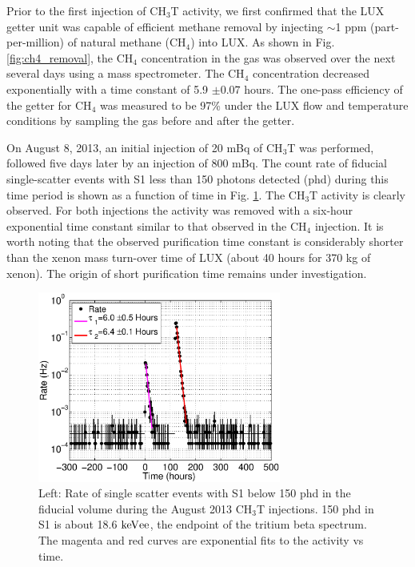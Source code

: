 Prior to the first injection of CH$_3$T activity, we first confirmed that the LUX getter unit was capable of efficient methane removal by injecting  $\sim$1 ppm (part-per-million) of natural methane (CH$_4$) into LUX. As shown in Fig. \ref{fig:ch4_removal}, the CH$_4$ concentration in the gas was observed over the next several days using a mass spectrometer. The CH$_4$ concentration decreased exponentially with a time constant of 5.9 $\pm 0.07$ hours. The one-pass efficiency of the getter for CH$_4$ was measured to be 97\% under the LUX flow and temperature conditions by sampling the gas before and after the getter. 

On August 8, 2013, an initial injection of 20 mBq of CH$_3$T was performed, followed five days later by an injection of 800 mBq. The count rate of fiducial single-scatter events with S1 less than 150 photons detected (phd) during this time period is shown as a function of time in Fig. \ref{fig:ch3t_removal}. The CH$_3$T activity is clearly observed. For both injections the activity was removed with a six-hour exponential time constant similar to that observed in the CH$_4$ injection. It is worth noting that the observed purification time constant is considerably shorter than the xenon mass turn-over time of LUX (about 40 hours for 370 kg of xenon).  The origin of short purification time remains under investigation.

\begin{figure}[h!]\centering
\includegraphics[width=80mm]{fig/CH3T_Rate_fid_150_Run03_Tritium_Rate.eps}
\caption{Left: Rate of single scatter events with S1 below 150 phd in the fiducial volume during the August 2013 CH$_3$T injections. 150 phd in S1 is about 18.6 $\rm keV{ee}$, the endpoint of the tritium beta spectrum. The magenta and red curves are exponential fits to the activity vs time.}
\label{fig:ch3t_removal}
\end{figure}

